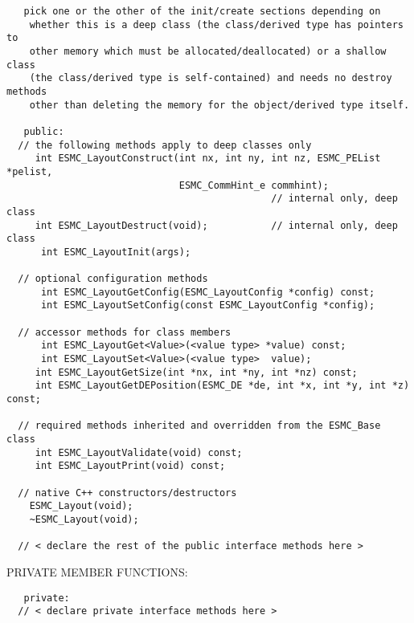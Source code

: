 \begin{verbatim}   pick one or the other of the init/create sections depending on
    whether this is a deep class (the class/derived type has pointers to
    other memory which must be allocated/deallocated) or a shallow class
    (the class/derived type is self-contained) and needs no destroy methods
    other than deleting the memory for the object/derived type itself.
 
   public:
  // the following methods apply to deep classes only
     int ESMC_LayoutConstruct(int nx, int ny, int nz, ESMC_PEList *pelist,
                              ESMC_CommHint_e commhint); 
                                              // internal only, deep class
     int ESMC_LayoutDestruct(void);           // internal only, deep class
      int ESMC_LayoutInit(args);
 
  // optional configuration methods
      int ESMC_LayoutGetConfig(ESMC_LayoutConfig *config) const;
      int ESMC_LayoutSetConfig(const ESMC_LayoutConfig *config);
 
  // accessor methods for class members
      int ESMC_LayoutGet<Value>(<value type> *value) const;
      int ESMC_LayoutSet<Value>(<value type>  value);
     int ESMC_LayoutGetSize(int *nx, int *ny, int *nz) const;
     int ESMC_LayoutGetDEPosition(ESMC_DE *de, int *x, int *y, int *z) const;
     
  // required methods inherited and overridden from the ESMC_Base class
     int ESMC_LayoutValidate(void) const;
     int ESMC_LayoutPrint(void) const;
 
  // native C++ constructors/destructors
 	ESMC_Layout(void);
 	~ESMC_Layout(void);
   
  // < declare the rest of the public interface methods here >
   \end{verbatim}{\sf PRIVATE MEMBER FUNCTIONS:}
\begin{verbatim}   private: 
  // < declare private interface methods here >\end{verbatim}

